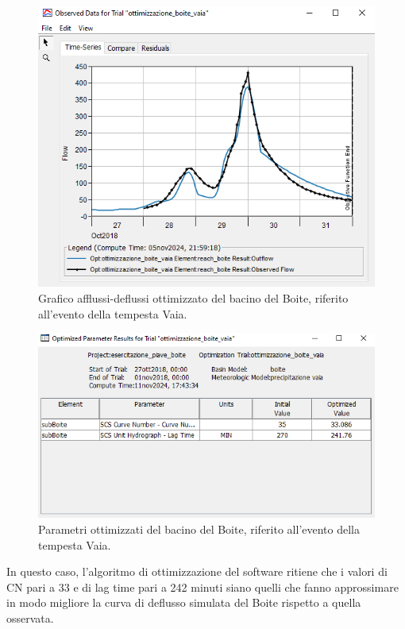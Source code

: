 \begin{figure}[H]\centering
\includegraphics[scale=1]{immagini/ottim_boite.PNG}
\caption{Grafico afflussi-deflussi ottimizzato del bacino del Boite, riferito all'evento della tempesta Vaia.}
    \label{ottim_boite}    
\end{figure}

\begin{figure}[H]\centering
    \includegraphics[scale=1]{immagini/par_ottimiz_boite.PNG}
    \caption{Parametri ottimizzati del bacino del Boite, riferito all'evento della tempesta Vaia.}
        \label{par_ottim_boite}    
    \end{figure}

In questo caso, l'algoritmo di ottimizzazione del software ritiene che i valori di CN pari a 33 e di lag time pari a 242 minuti siano quelli che fanno approssimare in modo migliore la curva di deflusso simulata del Boite rispetto a quella osservata.

